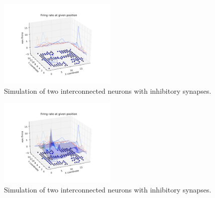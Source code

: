 \documentclass[12pt,a4paper,twocolumn]{article}
\begin{document}
\begin{figure}[htbp]
\centering
\includegraphics[width=0.5\textwidth]{figure7_a.png}
\caption{Simulation of two interconnected neurons with inhibitory synapses.\label{fig:part4b}}
\vspace{0.2cm}
\end{figure}
\begin{figure}[htbp]
\centering
\includegraphics[width=0.5\textwidth]{figure7_b.png}
\caption{Simulation of two interconnected neurons with inhibitory synapses.\label{fig:part4b}}
\vspace{0.2cm}
\end{figure}
\end{document}
